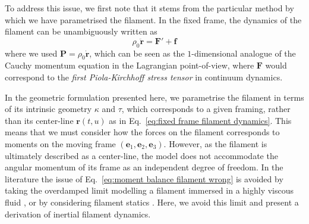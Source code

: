 To address this issue, we first note that it stems from the particular method by which we have parametrised the filament. In the fixed frame, the dynamics of the filament can be unambiguously written as
\begin{equation} \label{eq:fixed frame filament dynamics}
\rho_0 \ddot{\mathbf{r}} = \mathbf{F}' + \mathbf{f}
\end{equation}
where we used $\mathbf{P} = \rho_0 \dot{\mathbf{r}}$, which can be seen as the $1$-dimensional analogue of the Cauchy momentum equation in the Lagrangian point-of-view, where $\mathbf{F}$ would correspond to the \textit{first Piola-Kirchhoff stress tensor} in continuum dynamics.

In the geometric formulation presented here, we parametrise the filament in terms of its intrinsic geometry $\kappa$ and $\tau$, which corresponds to a given framing, rather than its center-line $\mathbf{r}(t,u)$ as in Eq.~\ref{eq:fixed frame filament dynamics}. This means that we must consider how the forces on the filament corresponds to moments on the moving frame $(\mathbf{e}_1, \mathbf{e}_2, \mathbf{e}_3)$. However, as the filament is ultimately described as a center-line, the model does not accommodate the angular momentum of its frame as an independent degree of freedom. In the literature the issue of Eq.~\ref{eq:moment balance filament wrong} is avoided by taking the overdamped limit modelling a filament immersed in a highly viscous fluid \citep{eloyKinematicsMostEfficient2012, tornbergSimulatingDynamicsInteractions2004, goldsteinNonlinearDynamicsStiff1995, sodaDynamicsStiffChains1973, nordgrenComputationMotionElastic1974, hasimotoSolitonVortexFilament1972, powersDynamicsFilamentsMembranes2010, goldsteinViscousNonlinearDynamics1998}, or by considering filament statics \citep{parkerDerivationNonlinearRod1984a}. Here, we avoid this limit and present a derivation of inertial filament dynamics.

